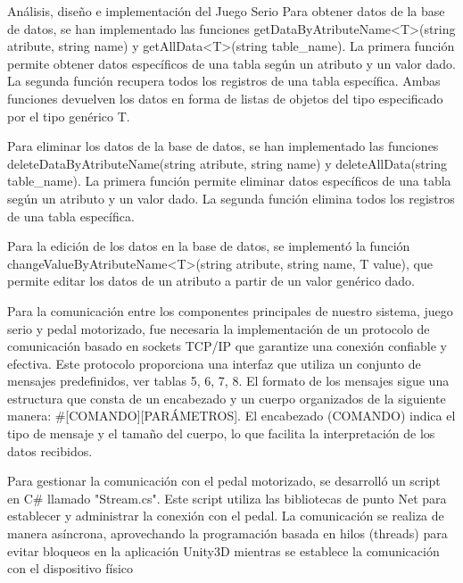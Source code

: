 \begin{thesischapter}{2} {Análisis, diseño e implementación del Juego Serio}
    Para obtener datos de la base de datos, se han implementado las funciones getDataByAtributeName<T>(string atribute, string name) y getAllData<T>(string table\_name). 
    La primera función permite obtener datos específicos de una tabla según un atributo y un valor dado. La segunda función recupera todos los registros de una tabla específica. 
    Ambas funciones devuelven los datos en forma de listas de objetos del tipo especificado por el tipo genérico T.

    Para eliminar los datos de la base de datos, se han implementado las funciones deleteDataByAtributeName(string atribute, string name) y deleteAllData(string table\_name). 
    La primera función permite eliminar datos específicos de una tabla según un atributo y un valor dado. La segunda función elimina todos los registros de una tabla específica. 

    Para la edición de los datos en la base de datos, se implementó la función changeValueByAtributeName<T>(string atribute, string name, T value), que 
    permite editar los datos de un atributo a partir de un valor genérico dado.

    Para la comunicación entre los componentes principales de nuestro sistema, juego serio y pedal motorizado,
    fue necesaria la implementación de un protocolo de comunicación basado en sockets TCP/IP
    que garantize una conexión confiable y efectiva. Este protocolo proporciona una interfaz que utiliza un conjunto 
    de mensajes predefinidos, ver tablas 5, 6, 7, 8. El formato de los mensajes sigue una estructura  
    que consta de un encabezado y un cuerpo organizados de la siguiente manera: \#[COMANDO][PARÁMETROS]. El 
    encabezado (COMANDO) indica el tipo de mensaje y el tamaño del cuerpo, lo que facilita la interpretación de los datos recibidos.

    \vspace{10pt} 
    Para gestionar la comunicación con el pedal motorizado, se desarrolló un script en C\# llamado "Stream.cs". Este script 
    utiliza las bibliotecas de punto Net para establecer y administrar la conexión con el pedal. 
    La comunicación se realiza de manera asíncrona, aprovechando la programación basada en hilos (threads) para evitar bloqueos 
    en la aplicación Unity3D mientras se establece la comunicación con el dispositivo físico
    

\end{thesischapter}
